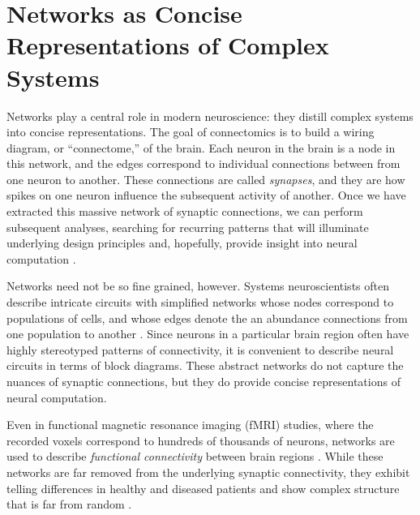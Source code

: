 \section{Networks as Concise Representations of Complex Systems}
Networks play a central role in modern neuroscience: they distill
complex systems into concise representations.  The goal of
connectomics \cite{sporns2005human} is to build a wiring diagram, or
``connectome,'' of the brain. Each neuron in the brain is a node in
this network, and the edges correspond to individual connections
between from one neuron to another. These connections are called
\emph{synapses}, and they are how spikes on one neuron influence the
subsequent activity of another.  Once we have extracted this massive
network of synaptic connections, we can perform subsequent analyses,
searching for recurring patterns that will illuminate underlying
design principles and, hopefully, provide insight into neural
computation \cite{bullmore2009complex}.


Networks need not be so fine grained, however.  Systems neuroscientists
often describe intricate circuits with simplified networks whose nodes
correspond to populations of cells, and whose edges denote the an
abundance connections from one population to another
\cite[e.g.]{felleman1991distributed, scannell1999connectional}.  Since
neurons in a particular brain region often have highly stereotyped
patterns of connectivity, it is convenient to describe neural circuits
in terms of block diagrams.  These abstract networks do not capture
the nuances of synaptic connections, but they do provide concise
representations of neural computation.

Even in functional magnetic resonance imaging (fMRI) studies, where the
recorded voxels correspond to hundreds of thousands of neurons, networks
are used to describe \emph{functional connectivity} between brain regions
\cite{friston1994functional}. While these networks are far removed from
the underlying synaptic connectivity, they exhibit telling differences
in healthy and diseased patients \cite{bassett2008hierarchical}
and show complex structure that is far from random \cite{bassett2006small}.

